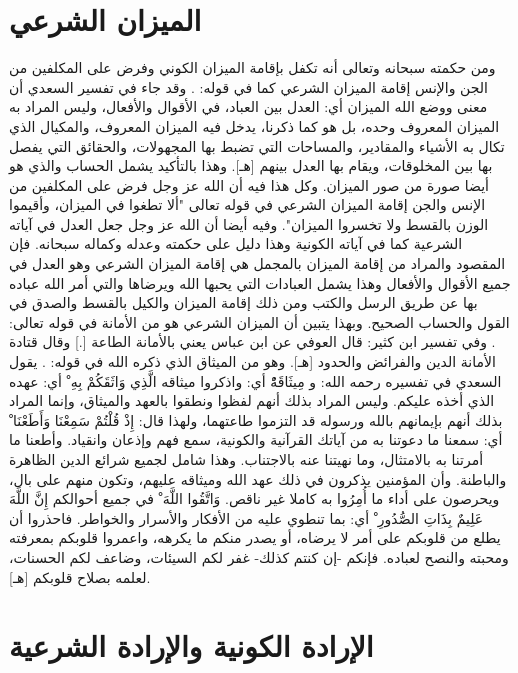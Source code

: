 \section{الميزان الشرعي}

ومن حكمته سبحانه وتعالى أنه تكفل بإقامة الميزان الكوني وفرض على المكلفين من الجن والإنس إقامة الميزان الشرعي كما في قوله:
\quranayah*[55][7-9]{\footnotesize \surahname*[55]}. وقد جاء في تفسير السعدي أن معنى ووضع الله الميزان أي: العدل بين العباد، في الأقوال والأفعال، وليس المراد به الميزان المعروف وحده، بل هو كما ذكرنا، يدخل فيه الميزان المعروف، والمكيال الذي تكال به الأشياء والمقادير، والمساحات التي تضبط بها المجهولات، والحقائق التي يفصل بها بين المخلوقات، ويقام بها العدل بينهم [هـ]. وهذا بالتأكيد يشمل الحساب والذي هو أيضا صورة من صور الميزان. وكل هذا فيه أن الله عز وجل فرض على المكلفين من الإنس والجن إقامة الميزان الشرعي في قوله تعالى "ألا تطغوا في الميزان، وأقيموا الوزن بالقسط ولا تخسروا الميزان". وفيه أيضا أن الله عز وجل جعل العدل في آياته الشرعية كما في آياته الكونية وهذا دليل على حكمته وعدله وكماله سبحانه.
فإن المقصود والمراد من إقامة الميزان بالمجمل هي إقامة الميزان الشرعي وهو العدل في جميع الأقوال والأفعال وهذا يشمل العبادات التي يحبها الله ويرضاها والتي أمر الله عباده بها عن طريق الرسل والكتب ومن ذلك إقامة الميزان والكيل بالقسط والصدق في القول والحساب الصحيح. وبهذا يتبين أن الميزان الشرعي هو من الأمانة في قوله تعالى:
\quranayah*[33][72]{\footnotesize \surahname*[33]}. وفي تفسير ابن كثير: قال العوفي عن ابن عباس يعني بالأمانة الطاعة [.] وقال قتادة الأمانة الدين والفرائض والحدود [هـ]. وهو من الميثاق الذي ذكره الله في قوله:
\quranayah*[5][7]{\footnotesize \surahname*[5]}. يقول السعدي في تفسيره رحمه الله:
و { مِيثَاقَهُْ} أي: واذكروا ميثاقه { الَّذِي وَاثَقَكُمْ بِهِ ْ} أي: عهده الذي أخذه عليكم. وليس المراد بذلك أنهم لفظوا ونطقوا بالعهد والميثاق، وإنما المراد بذلك أنهم بإيمانهم بالله ورسوله قد التزموا طاعتهما، ولهذا قال: { إِذْ قُلْتُمْ سَمِعْنَا وَأَطَعْنَا ْ} أي: سمعنا ما دعوتنا به من آياتك القرآنية والكونية، سمع فهم وإذعان وانقياد. وأطعنا ما أمرتنا به بالامتثال، وما نهيتنا عنه بالاجتناب. وهذا شامل لجميع شرائع الدين الظاهرة والباطنة. وأن المؤمنين يذكرون في ذلك عهد الله وميثاقه عليهم، وتكون منهم على بال، ويحرصون على أداء ما أُمِرُوا به كاملا غير ناقص. { وَاتَّقُوا اللَّهَ ْ} في جميع أحوالكم { إِنَّ اللَّهَ عَلِيمٌ بِذَاتِ الصُّدُورِ ْ} أي: بما تنطوي عليه من الأفكار والأسرار والخواطر. فاحذروا أن يطلع من قلوبكم على أمر لا يرضاه، أو يصدر منكم ما يكرهه، واعمروا قلوبكم بمعرفته ومحبته والنصح لعباده. فإنكم -إن كنتم كذلك- غفر لكم السيئات، وضاعف لكم الحسنات، لعلمه بصلاح قلوبكم [هـ].

\section{الإرادة الكونية والإرادة الشرعية}

